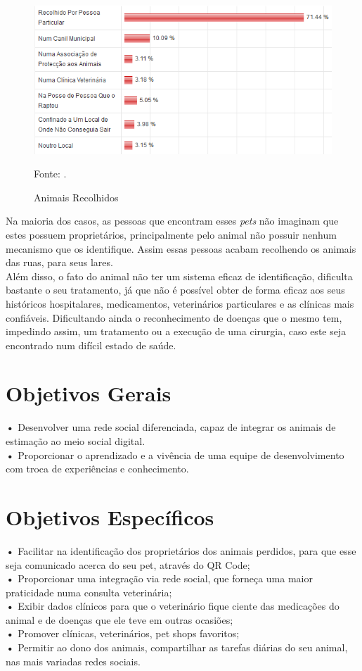 \begin{figure}[!htb]
	\centering
	\includegraphics[scale=0.70
	]{imagens/animais}
	\caption{Animais Recolhidos}
	Fonte: .
	\label{Rotulo}
\end{figure}
\newpage
Na maioria dos casos, as pessoas que encontram esses {\it pets} não imaginam que estes possuem proprietários, principalmente pelo animal não possuir nenhum mecanismo que os identifique. Assim essas pessoas acabam recolhendo os animais das ruas, para seus lares. 
\\
\indent
Além disso, o fato do animal não ter um sistema eficaz de identificação, dificulta bastante o seu tratamento, já que não é possível obter de forma eficaz aos seus históricos hospitalares, medicamentos, veterinários particulares e as clínicas mais confiáveis. Dificultando ainda o reconhecimento de doenças que o mesmo tem, impedindo assim, um tratamento ou a execução de uma cirurgia, caso este seja encontrado num difícil estado de saúde.  


\section{Objetivos Gerais}
\textbf{•} Desenvolver uma rede social diferenciada, capaz de integrar os animais de estimação ao meio social digital.
\\
\indent
\textbf{•} Proporcionar o aprendizado e a vivência de uma equipe de desenvolvimento com troca de experiências e conhecimento.

\section{Objetivos Específicos}
\textbf{•} Facilitar na identificação dos proprietários dos animais perdidos, para que esse seja comunicado acerca do seu pet, através do QR Code;
\\
\indent
\textbf{•} Proporcionar uma integração via rede social, que forneça uma maior praticidade numa consulta veterinária;
\\
\indent
\textbf{•} Exibir dados clínicos para que o veterinário fique ciente das medicações do animal e de doenças que ele teve em outras ocasiões;
\\
\indent
\textbf{•} Promover clínicas, veterinários, pet shops favoritos;
\\
\indent
\textbf{•} Permitir ao dono dos animais, compartilhar as tarefas diárias do seu animal, nas mais variadas redes sociais.

